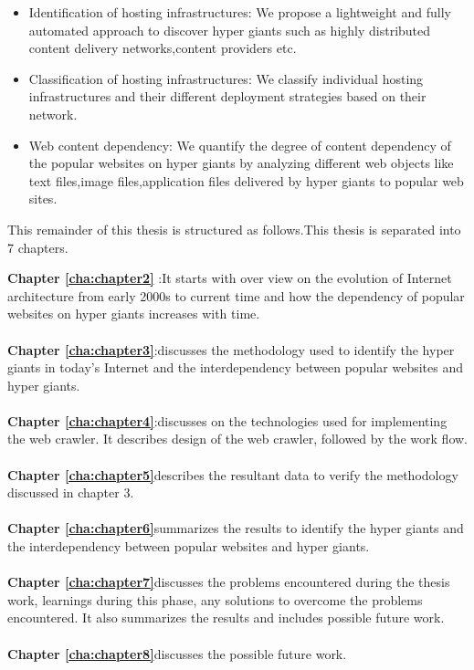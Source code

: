 \begin{itemize}
\item Identification of hosting infrastructures: We propose a lightweight and
fully automated approach to discover hyper giants such as highly distributed
content delivery networks,content providers etc.

\item Classification of hosting infrastructures: We classify individual hosting
infrastructures and their different deployment strategies based on their
network.

\item Web content dependency: We quantify the degree of content dependency
of the popular websites on hyper giants by analyzing different web objects like text files,image files,application files delivered by hyper giants to popular web sites.
\end{itemize}

This remainder of this thesis is structured as follows.This thesis is separated
into 7 chapters.

\textbf{Chapter \ref{cha:chapter2}} :It starts with over view on the evolution of Internet architecture from early 2000s to current time and how the dependency of popular websites on
hyper giants increases with time.
\\
\\
\textbf{Chapter \ref{cha:chapter3}}:discusses the methodology used to identify the hyper giants in today's Internet and the interdependency between popular websites and hyper giants.
\\
\\
\textbf{Chapter \ref{cha:chapter4}}:discusses on the technologies used for implementing the web crawler. It describes design of the web crawler, followed by the work flow. 
\\
\\
\textbf{Chapter \ref{cha:chapter5}}describes the resultant data to verify the methodology discussed in chapter 3.
\\
\\
\textbf{Chapter \ref{cha:chapter6}}summarizes the results to identify the hyper giants and the interdependency between popular websites and hyper giants.
\\
\\
\textbf{Chapter \ref{cha:chapter7}}discusses the problems encountered during the thesis work, learnings during this phase, any solutions to overcome the problems encountered. It also summarizes the results and includes possible future work. 
\\
\\
\textbf{Chapter \ref{cha:chapter8}}discusses the possible future work.

